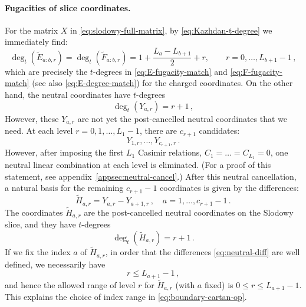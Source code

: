 \documentclass[12pt,a4paper]{article}
\begin{document}
\paragraph{Fugacities of slice coordinates.}
For the matrix $X$ in \eqref{eq:slodowy-full-matrix}, by \eqref{eq:Kazhdan-t-degree} we immediately find:
\begin{equation}
    \deg_t(\tilde{E}_{a:b,r})=\deg_t(\tilde{F}_{a:b,r})
 =1+\frac{L_a-L_{b+1}}{2}+r,
 \qquad r=0,\ldots,L_{b+1}-1\,,
 \label{eq:app-root-fugacity}
\end{equation}
which are precisely the $t$-degrees in \eqref{eq:E-fugacity-match} and \eqref{eq:F-fugacity-match} (see also \eqref{eq:E-degree-match}) for the charged coordinates. On the other hand, the neutral coordinates have $t$-degrees
\begin{equation}
 \deg_t(Y_{a,r})=r+1\,,
 \label{eq:app-neutral-fugacity}
\end{equation}
However, these $Y_{a,r}$ are not yet the post-cancelled neutral coordinates that we need. At each level $r=0,1,\dots,L_1-1$, there are $c_{r+1}$ candidates:
\begin{equation}
    Y_{1,r},\dots,Y_{c_{r+1},r}\,.
\end{equation}
However, after imposing the first $L_1$ Casimir relations, $C_1=\dots=C_{L_1}=0$, one neutral linear combination at each level is eliminated. (For a proof of this statement, see appendix~\ref{appsec:neutral-cancel}.) After this neutral cancellation, a natural basis for the remaining $c_{r+1}-1$ coordinates is given by the differences:
\begin{equation}
\label{eq:neutral-diff}
    \tilde{H}_{a,r}=Y_{a,r}-Y_{a+1,r}\,,\quad a=1,\dots,c_{r+1}-1\,.
\end{equation}
The coordinates $\tilde{H}_{a,r}$ are the post-cancelled neutral coordinates on the Slodowy slice, and they have $t$-degrees
\begin{equation}
 \deg_t(\tilde{H}_{a,r})=r+1\,.
 \label{eq:app-post-neutral-fugacity}
\end{equation}
If we fix the index $a$ of $\tilde{H}_{a,r}$, in order that the differences \eqref{eq:neutral-diff} are well defined, we necessarily have
\begin{equation}
        r\leq L_{a+1}-1\,,
\end{equation}
and hence the allowed range of level $r$ for $\tilde{H}_{a,r}$ (with $a$ fixed) is $0\leq r\leq L_{a+1}-1$. This explains the choice of index range in \eqref{eq:boundary-cartan-op}.
\end{document}
